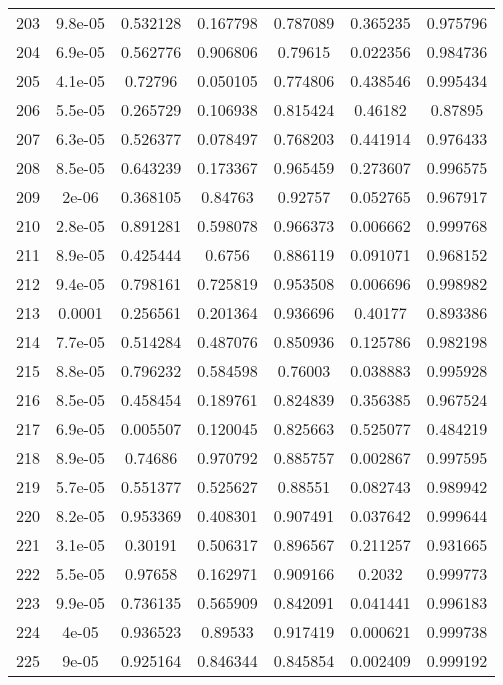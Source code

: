 \begin{table}
\begin{tabular}{c|c|c|c|c|c|c}
203 & 9.8e-05 & 0.532128 & 0.167798 & 0.787089 & 0.365235 & 0.975796\\
204 & 6.9e-05 & 0.562776 & 0.906806 & 0.79615 & 0.022356 & 0.984736\\
205 & 4.1e-05 & 0.72796 & 0.050105 & 0.774806 & 0.438546 & 0.995434\\
206 & 5.5e-05 & 0.265729 & 0.106938 & 0.815424 & 0.46182 & 0.87895\\
207 & 6.3e-05 & 0.526377 & 0.078497 & 0.768203 & 0.441914 & 0.976433\\
208 & 8.5e-05 & 0.643239 & 0.173367 & 0.965459 & 0.273607 & 0.996575\\
209 & 2e-06 & 0.368105 & 0.84763 & 0.92757 & 0.052765 & 0.967917\\
210 & 2.8e-05 & 0.891281 & 0.598078 & 0.966373 & 0.006662 & 0.999768\\
211 & 8.9e-05 & 0.425444 & 0.6756 & 0.886119 & 0.091071 & 0.968152\\
212 & 9.4e-05 & 0.798161 & 0.725819 & 0.953508 & 0.006696 & 0.998982\\
213 & 0.0001 & 0.256561 & 0.201364 & 0.936696 & 0.40177 & 0.893386\\
214 & 7.7e-05 & 0.514284 & 0.487076 & 0.850936 & 0.125786 & 0.982198\\
215 & 8.8e-05 & 0.796232 & 0.584598 & 0.76003 & 0.038883 & 0.995928\\
216 & 8.5e-05 & 0.458454 & 0.189761 & 0.824839 & 0.356385 & 0.967524\\
217 & 6.9e-05 & 0.005507 & 0.120045 & 0.825663 & 0.525077 & 0.484219\\
218 & 8.9e-05 & 0.74686 & 0.970792 & 0.885757 & 0.002867 & 0.997595\\
219 & 5.7e-05 & 0.551377 & 0.525627 & 0.88551 & 0.082743 & 0.989942\\
220 & 8.2e-05 & 0.953369 & 0.408301 & 0.907491 & 0.037642 & 0.999644\\
221 & 3.1e-05 & 0.30191 & 0.506317 & 0.896567 & 0.211257 & 0.931665\\
222 & 5.5e-05 & 0.97658 & 0.162971 & 0.909166 & 0.2032 & 0.999773\\
223 & 9.9e-05 & 0.736135 & 0.565909 & 0.842091 & 0.041441 & 0.996183\\
224 & 4e-05 & 0.936523 & 0.89533 & 0.917419 & 0.000621 & 0.999738\\
225 & 9e-05 & 0.925164 & 0.846344 & 0.845854 & 0.002409 & 0.999192\\
\end{tabular}
\end{table}
